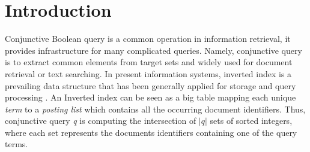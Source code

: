 \section{Introduction}
Conjunctive Boolean query is a common operation in information retrieval, it provides infrastructure for many complicated queries.
Namely, conjunctive query is to extract common elements from target sets and widely used for document retrieval or text searching.
In present information systems, inverted index is a prevailing data structure that has been generally applied for storage and query processing \cite{culpepper2010efficient,zobel2006inverted}.
An Inverted index can be seen as a big table mapping each unique \textit{term} to a \textit{posting list} which contains all the occurring document identifiers.
Thus, conjunctive query \textit{q} is computing the intersection of $ |q| $ sets of sorted integers, where each set represents the documents identifiers containing one of the query terms.

